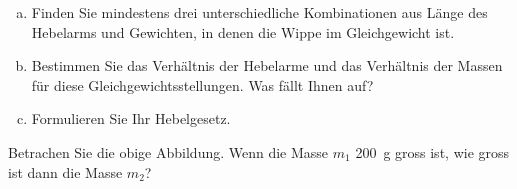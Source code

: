 \begin{aufgabe}
	\begin{enumerate}[a)]
		\item Finden Sie mindestens drei unterschiedliche Kombinationen aus Länge des Hebelarms und Gewichten, in denen die Wippe im Gleichgewicht ist.
		\item Bestimmen Sie das Verhältnis der Hebelarme und das Verhältnis der Massen für diese Gleichgewichtsstellungen. Was fällt Ihnen auf?
		\item Formulieren Sie Ihr Hebelgesetz.
	\end{enumerate}
	
\end{aufgabe}

\begin{aufgabe}
	Betrachen Sie die obige Abbildung. Wenn die Masse $m_1$ \SI{200}{g} gross ist, wie gross ist dann die Masse $m_2$?
\end{aufgabe}

